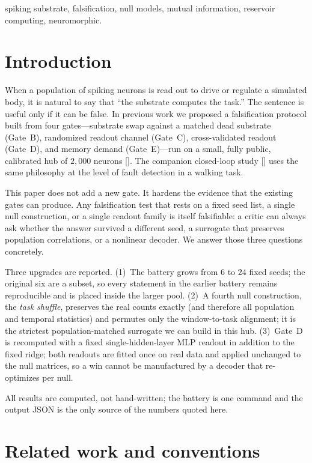 \documentclass[journal]{IEEEtran}
\begin{document}
\begin{IEEEkeywords}
spiking substrate, falsification, null models, mutual information, reservoir
computing, neuromorphic.
\end{IEEEkeywords}

\section{Introduction}

When a population of spiking neurons is read out to drive or regulate a simulated
body, it is natural to say that ``the substrate computes the task.'' The sentence
is useful only if it can be false. In previous work we proposed a falsification
protocol built from four gates---substrate swap against a matched dead substrate
(Gate~B), randomized readout channel (Gate~C), cross-validated readout (Gate~D),
and memory demand (Gate~E)---run on a small, fully public, calibrated hub of
$2{,}000$ neurons [\cite{b1}]. The companion closed-loop study [\cite{b2}]
uses the same philosophy at the level of fault detection in a walking task.

This paper does not add a new gate. It hardens the evidence that the existing
gates can produce. Any falsification test that rests on a fixed seed list, a
single null construction, or a single readout family is itself falsifiable: a
critic can always ask whether the answer survived a different seed, a surrogate
that preserves population correlations, or a nonlinear decoder. We answer those
three questions concretely.

Three upgrades are reported. (1)~The battery grows from $6$ to $24$ fixed seeds;
the original six are a subset, so every statement in the earlier battery remains
reproducible and is placed inside the larger pool. (2)~A fourth null
construction, the \emph{task shuffle}, preserves the real counts exactly (and
therefore all population and temporal statistics) and permutes only the
window-to-task alignment; it is the strictest population-matched surrogate we can
build in this hub. (3)~Gate~D is recomputed with a fixed single-hidden-layer
MLP readout in addition to the fixed ridge; both readouts are fitted once on real
data and applied unchanged to the null matrices, so a win cannot be manufactured
by a decoder that re-optimizes per null.

All results are computed, not hand-written; the battery is one command and the
output JSON is the only source of the numbers quoted here.

\section{Related work and conventions}
\end{document}
